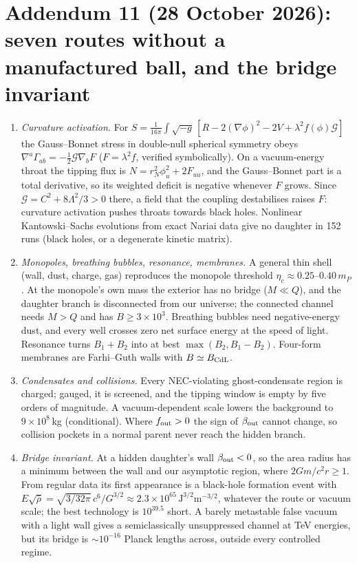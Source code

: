 \documentclass[11pt,a4paper]{article}
\theoremstyle{remark}\newtheorem{remark}[theorem]{Remark}
\begin{document}
\section*{Addendum 11 (28 October 2026): seven routes without a manufactured ball, and the bridge invariant}
\begin{enumerate}
\item \emph{Curvature activation.} For $S=\frac{1}{16\pi}\int\sqrt{-g}\,[R-2(\nabla\phi)^2-2V+\lambda^2f(\phi)\mathcal G]$ the Gauss--Bonnet stress in
double-null spherical symmetry obeys $\nabla^a\Gamma_{ab}=-\tfrac12\mathcal G\nabla_bF$ ($F=\lambda^2 f$, verified symbolically). On a vacuum-energy throat
the tipping flux is $N=r_N^2\phi_u^2+2F_{uu}$, and the Gauss--Bonnet part is a total derivative, so its weighted deficit is negative whenever $F$ grows.
Since $\mathcal G=C^2+8\Lambda^2/3>0$ there, a field that the coupling destabilises raises $F$: curvature activation pushes throats towards black holes.
Nonlinear Kantowski--Sachs evolutions from exact Nariai data give no daughter in 152 runs (black holes, or a degenerate kinetic matrix).
\item \emph{Monopoles, breathing bubbles, resonance, membranes.} A general thin shell (wall, dust, charge, gas) reproduces the monopole threshold
$\eta_c\approx0.25$--$0.40\,m_P$. At the monopole's own mass the exterior has no bridge ($M\ll Q$), and the daughter branch is disconnected from our
universe; the connected channel needs $M>Q$ and has $B\ge3\times10^3$. Breathing bubbles need negative-energy dust, and every well crosses zero net
surface energy at the speed of light. Resonance turns $B_1+B_2$ into at best $\max(B_2,B_1-B_2)$. Four-form membranes are Farhi--Guth walls with
$B\simeq B_{\rm CdL}$.
\item \emph{Condensates and collisions.} Every NEC-violating ghost-condensate region is charged; gauged, it is screened, and the tipping window is
empty by five orders of magnitude. A vacuum-dependent scale lowers the background to $9\times10^8$\,kg (conditional). Where $f_{\rm out}>0$ the sign of
$\beta_{\rm out}$ cannot change, so collision pockets in a normal parent never reach the hidden branch.
\item \emph{Bridge invariant.} At a hidden daughter's wall $\beta_{\rm out}<0$, so the area radius has a minimum between the wall and our asymptotic
region, where $2Gm/c^2r\ge1$. From regular data its first appearance is a black-hole formation event with
$E\sqrt{\bar\rho}=\sqrt{3/32\pi}\,c^6/G^{3/2}\approx2.3\times10^{65}\,\mathrm{J^{3/2}m^{-3/2}}$, whatever the route or vacuum scale; the best technology is
$10^{39.5}$ short. A barely metastable false vacuum with a light wall gives a semiclassically unsuppressed channel at TeV energies, but its bridge is
$\sim10^{-16}$ Planck lengths across, outside every controlled regime.
\end{enumerate}
\end{document}
